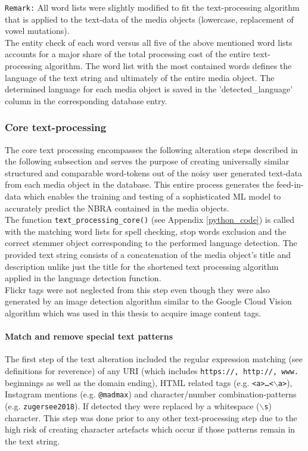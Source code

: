 \newline
\texttt{Remark:} All word lists were slightly modified to fit the text-processing algorithm that is applied to the text-data of the media objects (lowercase, replacement of vowel mutations).\\
\newline
The entity check of each word versus all five of the above mentioned word lists accounts for a major share of the total processing cost of the entire text-processing algorithm. The word list with the most contained words defines the language of the text string and ultimately of the entire media object. The determined language for each media object is saved in the 'detected\_language' column in the corresponding database entry.\\


\subsubsection{Core text-processing} \label{core_text_processing}
The core text processing encompasses the following alteration steps described in the following subsection and serves the purpose of creating universally similar structured and comparable word-tokens out of the noisy user generated text-data from each media object in the database. This entire process generates the feed-in-data which enables the training and testing of a sophisticated ML model to accurately predict the NBRA contained in the media objects.\\
The function \texttt{text\_processing\_core()} (see Appendix \ref{python_code}) is called with the matching word lists for spell checking, stop words exclusion and the correct stemmer object corresponding to the performed language detection. The provided text string consists of a concatenation of the media object's title and description unlike just the title for the shortened text processing algorithm applied in the language detection function.\\
Flickr tags were not neglected from this step even though they were also generated by an image detection algorithm similar to the Google Cloud Vision algorithm which was used in this thesis to acquire image content tags.

\paragraph*{Match and remove special text patterns} \label{text_patterns}
The first step of the text alteration included the regular expression matching (see definitions for reverence) of any URI (which includes \texttt{https://, http://, www.} beginnings as well as the domain ending), HTML related tags (e.g. \texttt{<a>\dots<$\backslash$a>}), Instagram mentions (e.g. \texttt{@madmax}) and character/number combination-patterns (e.g. \texttt{zugersee2018}). If detected they were replaced by a whitespace (\texttt{$\backslash$s}) character. This step was done prior to any other text-processing step due to the high risk of creating character artefacts which occur if those patterns remain in the text string.

